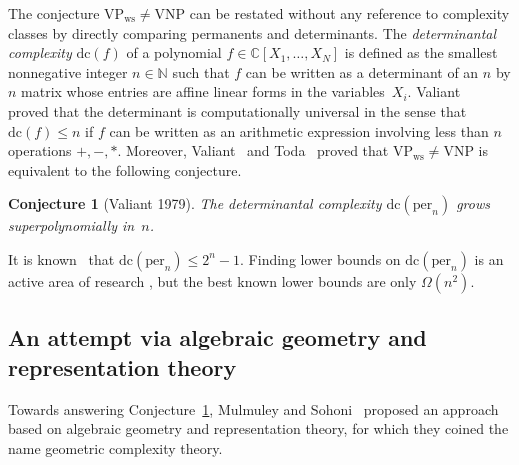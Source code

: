 \documentclass[11pt]{amsart}
\def\N{\mathbb{N}}
\def\C{\mathbb{C}}
\def\per{\mathrm{per}}
\def\VNP{\mathrm{VNP}}
\def\VPs{\mathrm{VP}_{\mathrm{ws}}}
\def\dc{\mathrm{dc}}
\numberwithin{equation}{section}
\newtheorem{conjecture}[theorem]{Conjecture}
\begin{document}
The conjecture $\VPs\ne\VNP$ can be restated without any reference to complexity
classes by directly comparing permanents and determinants. 
The {\em determinantal complexity} $\dc(f)$ of a polynomial 
$f\in\C[X_1,\ldots,X_N]$ is defined as the smallest
nonnegative integer $n\in\N$ such
that $f$ can be written as a determinant of an $n$ by $n$ matrix whose 
entries are affine linear forms in the variables~$X_i$. 
Valiant~\cite{Val:79a} proved that the determinant is computationally universal 
in the sense that $\dc(f) \le n$ 
if $f$ can be written as an arithmetic expression involving less than $n$ operations $+,-,*$.
Moreover, 
Valiant~\cite{Val:79a,vali:82} and Toda~\cite{toda:92} 
proved that $\VPs\ne\VNP$ is equivalent to the  
following conjecture. 

\begin{conjecture}[Valiant 1979]\label{conj:dc}
The determinantal complexity $\dc(\per_n)$ grows
superpolynomially in~$n$.
\end{conjecture}

It is known~\cite{grenet:11} that $\dc(\per_n) \le 2^n -1$.  
Finding lower bounds on $\dc(\per_n)$ is an active area of research
\cite{mignon-ressayre:04,cai:2010,lamare:13,hu-ik:14,al-bo-ve:15,yabe:15},
but the best known lower bounds are only $\Omega(n^2)$.  


\subsection{An attempt via algebraic geometry and representation theory}

Towards answering Conjecture~\ref{conj:dc}, 
Mulmuley and Sohoni~\cite{gct1,gct2,mulmuley:11} proposed an approach based on algebraic geometry and
representation theory, for which they coined the name geometric complexity theory. 
\end{document}
